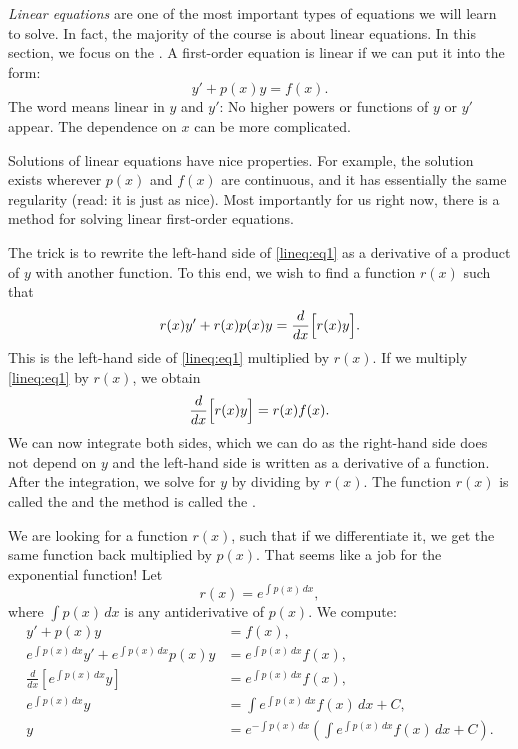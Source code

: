 

\emph{Linear equations}
are one of the most important types of equations we will learn to solve.
In fact, the majority of the course is about linear
equations.  In this section, we focus on the
\emph{}.
A first-order equation is linear if we can put it
into the form:
\begin{equation} \label{lineq:eq1}
y' + p(x) y = f(x) .
\end{equation}
The word
 means linear in $y$ and $y'$:
No higher powers or functions of $y$ or $y'$ appear.
The dependence on $x$ can be more
complicated.

Solutions of linear equations have nice properties.  For example, the
solution exists wherever $p(x)$ and $f(x)$ are continuous,
and it has essentially the same
regularity (read: it is just as nice).  Most importantly for us right now,
there is a method for solving linear first-order equations.

The trick is to rewrite the left-hand side
of \eqref{lineq:eq1} as a derivative of a product of $y$ with another
function.
To this end,
we wish to find a function $r(x)$ such that
\begin{equation*}
r(x) y' + r(x) p(x) y = \frac{d}{dx}\Bigl[ r(x) y \Bigr] .
\end{equation*}
This is the left-hand side of
\eqref{lineq:eq1} multiplied by $r(x)$.  If we multiply \eqref{lineq:eq1} by
$r(x)$, we obtain
\begin{equation*}
\frac{d}{dx}\Bigl[ r(x) y \Bigr] = r(x)f(x) .
\end{equation*}
We can now integrate both sides, which we can do as
the right-hand side does not depend on $y$ and the left-hand side
is written as a derivative of a function.  After the integration, we solve for $y$
by dividing by $r(x)$.
The function $r(x)$ is called the \emph{} and the
method is called the \emph{}.

We are looking for a function $r(x)$, such that if
we differentiate it, we get the same function back multiplied by $p(x)$.
That seems like a job for the exponential function!  Let
\begin{equation*}
r(x) = e^{\int p(x) \,dx} ,
\end{equation*}
where $\int p(x)\, dx$ is any antiderivative of $p(x)$.
We compute:
\begin{equation*}
\begin{aligned}
y' + p(x) y &= f(x) , \\
e^{\int p(x) \,dx} y' + e^{\int p(x) \,dx} p(x) y & = e^{\int p(x) \,dx} f(x) , \\
\frac{d}{dx}\left[ e^{\int p(x) \,dx} y \right] & = e^{\int p(x) \,dx} f(x) , \\
e^{\int p(x) \,dx} y & = \int e^{\int p(x) \,dx} f(x) \,dx + C , \\
y & = e^{-\int p(x) \,dx} \left( \int e^{\int p(x) \,dx} f(x) \,dx + C \right) .
\end{aligned}
\end{equation*}


